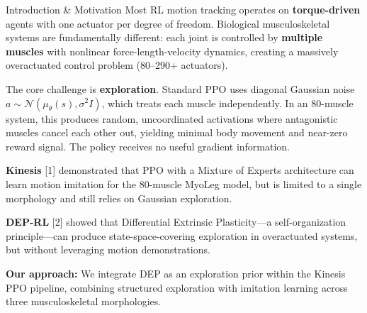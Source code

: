 \documentclass[landscape]{article}
\begin{document}
\noindent
\begin{minipage}[t]{0.235\textwidth}

\begin{posterblock}{Introduction \& Motivation}
\fontsize{13}{16}\selectfont
Most RL motion tracking operates on \textbf{torque-driven} agents with one actuator per degree of freedom. Biological musculoskeletal systems are fundamentally different: each joint is controlled by \textbf{multiple muscles} with nonlinear force-length-velocity dynamics, creating a massively overactuated control problem (80--290+ actuators).

\vspace{4pt}
The core challenge is \textbf{exploration}. Standard PPO uses diagonal Gaussian noise $a \sim \mathcal{N}(\mu_\theta(s), \sigma^2 I)$, which treats each muscle independently. In an 80-muscle system, this produces random, uncoordinated activations where antagonistic muscles cancel each other out, yielding minimal body movement and near-zero reward signal. The policy receives no useful gradient information.

\vspace{4pt}
\textbf{Kinesis} [1] demonstrated that PPO with a Mixture of Experts architecture can learn motion imitation for the 80-muscle MyoLeg model, but is limited to a single morphology and still relies on Gaussian exploration.

\vspace{4pt}
\textbf{DEP-RL} [2] showed that Differential Extrinsic Plasticity---a self-organization principle---can produce state-space-covering exploration in overactuated systems, but without leveraging motion demonstrations.

\vspace{5pt}
{\color{stanford}\textbf{Our approach:}} We integrate DEP as an exploration prior within the Kinesis PPO pipeline, combining structured exploration with imitation learning across three musculoskeletal morphologies.
\end{posterblock}

\end{minipage}%
\hfill
\end{document}
